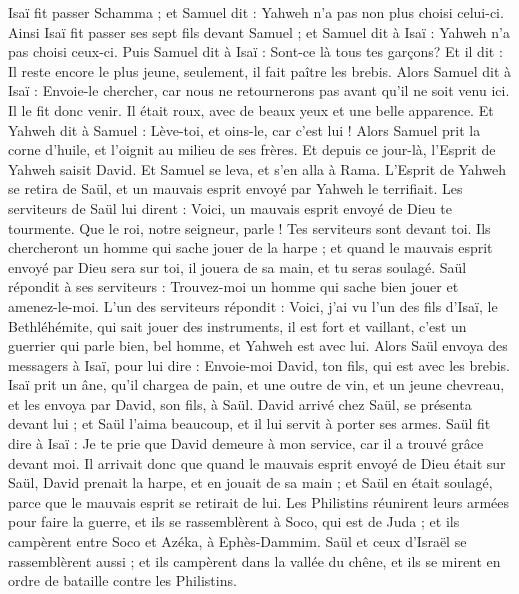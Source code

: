 \begin{multicols}{2}
Isaï fit passer Schamma ; et Samuel dit : Yahweh n'a pas non plus choisi celui-ci.
Ainsi Isaï fit passer ses sept fils devant Samuel ; et Samuel dit à Isaï : Yahweh n'a pas choisi ceux-ci.
Puis Samuel dit à Isaï : Sont-ce là tous tes garçons? Et il dit : Il reste encore le plus jeune, seulement, il fait paître les brebis. Alors Samuel dit à Isaï : Envoie-le chercher, car nous ne retournerons pas avant qu'il ne soit venu ici.
Il le fit donc venir. Il était roux, avec de beaux yeux et une belle apparence. Et Yahweh dit à Samuel : Lève-toi, et oins-le, car c'est lui !
Alors Samuel prit la corne d'huile, et l'oignit au milieu de ses frères. Et depuis ce jour-là, l'Esprit de Yahweh saisit David. Et Samuel se leva, et s'en alla à Rama.
L'Esprit de Yahweh se retira de Saül, et un mauvais esprit envoyé par Yahweh le terrifiait.
Les serviteurs de Saül lui dirent : Voici, un mauvais esprit envoyé de Dieu te tourmente.
Que le roi, notre seigneur, parle ! Tes serviteurs sont devant toi. Ils chercheront un homme qui sache jouer de la harpe ; et quand le mauvais esprit envoyé par Dieu sera sur toi, il jouera de sa main, et tu seras soulagé.
Saül répondit à ses serviteurs : Trouvez-moi un homme qui sache bien jouer et amenez-le-moi.
L'un des serviteurs répondit : Voici, j'ai vu l'un des fils d'Isaï, le Bethléhémite, qui sait jouer des instruments, il est fort et vaillant, c'est un guerrier qui parle bien, bel homme, et Yahweh est avec lui.
Alors Saül envoya des messagers à Isaï, pour lui dire : Envoie-moi David, ton fils, qui est avec les brebis.
Isaï prit un âne, qu'il chargea de pain, et une outre de vin, et un jeune chevreau, et les envoya par David, son fils, à Saül.
David arrivé chez Saül, se présenta devant lui ; et Saül l'aima beaucoup, et il lui servit à porter ses armes.
Saül fit dire à Isaï : Je te prie que David demeure à mon service, car il a trouvé grâce devant moi.
Il arrivait donc que quand le mauvais esprit envoyé de Dieu était sur Saül, David prenait la harpe, et en jouait de sa main ; et Saül en était soulagé, parce que le mauvais esprit se retirait de lui.
\VerseOne{}Les Philistins réunirent leurs armées pour faire la guerre, et ils se rassemblèrent à Soco, qui est de Juda ; et ils campèrent entre Soco et Azéka, à Ephès-Dammim.
Saül et ceux d'Israël se rassemblèrent aussi ; et ils campèrent dans la vallée du chêne, et ils se mirent en ordre de bataille contre les Philistins.

\end{multicols}

